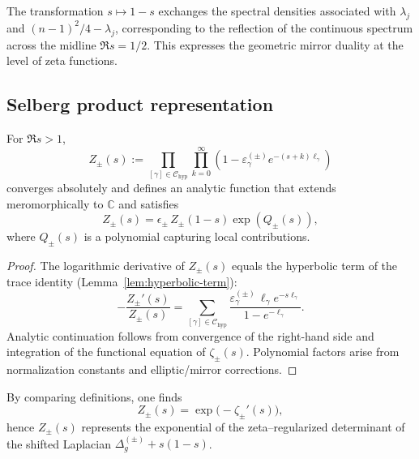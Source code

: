 \begin{remark}
\label{rem:spectral-duality}
The transformation $s\mapsto1-s$ exchanges the spectral densities associated with $\lambda_j$ and $(n-1)^2/4-\lambda_j$, corresponding to the reflection of the continuous spectrum across the midline $\Re s=1/2$.  
This expresses the geometric mirror duality at the level of zeta functions. %
\end{remark}

\subsection{Selberg product representation}
\label{subsec:ch6-part7-selberg-product} \relax

\begin{theorem}
\label{thm:mirror-selberg-product}
For $\Re s>1$,
\[
Z_\pm(s)
:=\prod_{[\gamma]\in\mathcal{C}_{\mathrm{hyp}}}
\prod_{k=0}^\infty \left(1-\varepsilon_\gamma^{(\pm)}e^{-(s+k)\ell_\gamma}\right)
\]
converges absolutely and defines an analytic function that extends meromorphically to $\mathbb{C}$ and satisfies
\[
Z_\pm(s)
=\epsilon_\pm\,Z_\pm(1-s)\exp(Q_\pm(s)),
\]
where $Q_\pm(s)$ is a polynomial capturing local contributions. %
\end{theorem}

\begin{proof}
The logarithmic derivative of $Z_\pm(s)$ equals the hyperbolic term of the trace identity (Lemma~\ref{lem:hyperbolic-term}):
\[
-\frac{Z_\pm'(s)}{Z_\pm(s)}
=\sum_{[\gamma]\in\mathcal{C}_{\mathrm{hyp}}}
\frac{\varepsilon_\gamma^{(\pm)}\,\ell_\gamma e^{-s\ell_\gamma}}{1-e^{-\ell_\gamma}}.
\]
Analytic continuation follows from convergence of the right-hand side and integration of the functional equation of $\zeta_\pm(s)$.  
Polynomial factors arise from normalization constants and elliptic/mirror corrections. %
\end{proof}

\begin{remark}
\label{rem:spectral-determinant-link}
By comparing definitions, one finds
\[
Z_\pm(s)
=\exp\!\big(-\zeta_\pm'(s)\big),
\]
hence $Z_\pm(s)$ represents the exponential of the zeta–regularized determinant of the shifted Laplacian $\Delta_g^{(\pm)}+s(1-s)$. %
\end{remark}

